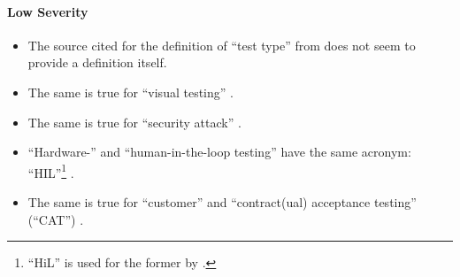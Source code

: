 \paragraph{Low Severity}
\begin{itemize}
      \item %
            The source cited for the definition of ``test type'' from
            \citepISTQB{} does not seem to provide a definition itself.
      \item %
            The same is true for ``visual testing'' \citepISTQB{}.
      \item %
            The same is true for ``security attack'' \citepISTQB{}.
      \item %
            ``Hardware-'' and ``human-in-the-loop testing'' have the same
            acronym: ``HIL''\footnote{``HiL'' is used for the former by
                  \citet[p.~2]{PreußeEtAl2012}.} \citep[p.~23]{Firesmith2015}.
      \item %
            The same is true for ``customer'' and ``contract(ual) acceptance
            testing'' (``CAT'') \citep[p.~30]{Firesmith2015}.
\end{itemize}\fi